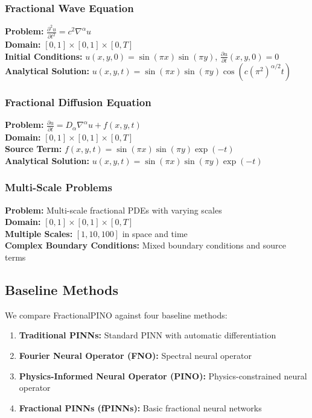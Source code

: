 \documentclass[12pt,a4paper]{article}
\theoremstyle{definition}
\begin{document}
\subsubsection{Fractional Wave Equation}

\textbf{Problem:} $\frac{\partial^2 u}{\partial t^2} = c^2 \nabla^\alpha u$ \\
\textbf{Domain:} $[0,1] \times [0,1] \times [0,T]$ \\
\textbf{Initial Conditions:} $u(x,y,0) = \sin(\pi x)\sin(\pi y)$, $\frac{\partial u}{\partial t}(x,y,0) = 0$ \\
\textbf{Analytical Solution:} $u(x,y,t) = \sin(\pi x)\sin(\pi y)\cos(c(\pi^2)^{\alpha/2} t)$

\subsubsection{Fractional Diffusion Equation}

\textbf{Problem:} $\frac{\partial u}{\partial t} = D_\alpha \nabla^\alpha u + f(x,y,t)$ \\
\textbf{Domain:} $[0,1] \times [0,1] \times [0,T]$ \\
\textbf{Source Term:} $f(x,y,t) = \sin(\pi x)\sin(\pi y)\exp(-t)$ \\
\textbf{Analytical Solution:} $u(x,y,t) = \sin(\pi x)\sin(\pi y)\exp(-t)$

\subsubsection{Multi-Scale Problems}

\textbf{Problem:} Multi-scale fractional PDEs with varying scales \\
\textbf{Domain:} $[0,1] \times [0,1] \times [0,T]$ \\
\textbf{Multiple Scales:} $[1, 10, 100]$ in space and time \\
\textbf{Complex Boundary Conditions:} Mixed boundary conditions and source terms

\subsection{Baseline Methods}

We compare FractionalPINO against four baseline methods:

\begin{enumerate}
    \item \textbf{Traditional PINNs:} Standard PINN with automatic differentiation
    \item \textbf{Fourier Neural Operator (FNO):} Spectral neural operator
    \item \textbf{Physics-Informed Neural Operator (PINO):} Physics-constrained neural operator
    \item \textbf{Fractional PINNs (fPINNs):} Basic fractional neural networks
\end{enumerate}
\end{document}
